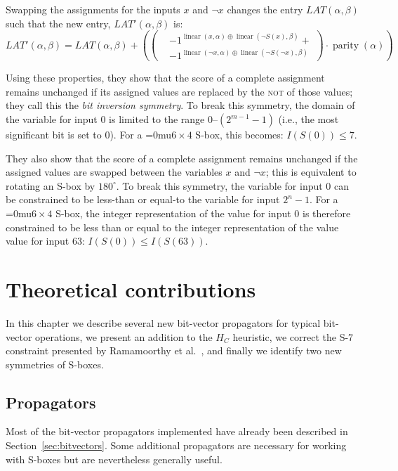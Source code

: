 \documentclass[a4paper,10pt,twoside,openright]{book}
\renewcommand{\sc}[1]{\textsc{\lowercase{#1}}}
\newcommand*\sixbyfour{\begingroup\medmuskip=0mu\relax$6 \times 4$\endgroup}
\DeclareMathOperator{\parity}{parity}
\DeclareMathOperator{\lin}{linear}
\begin{document}
Swapping the assignments for the inputs $x$ and $\lnot x$
changes the entry $\mathit{LAT}(\alpha,\beta)$
such that the new entry, $\mathit{LAT}'(\alpha,\beta)$ is:
\[
\mathit{LAT}'(\alpha,\beta) = \mathit{LAT}(\alpha,\beta) + \left(
    \left(
        \begin{aligned}
        &-1^{\lin(x,\alpha) \oplus \lin(\lnot S(x), \beta)} + \\
        &-1^{\lin(\lnot x,\alpha) \oplus \lin(\lnot S(\lnot x), \beta)} 
        \end{aligned}
    \right)
    \cdot 
    \parity(\alpha) 
\right)
\]

Using these properties, 
they show that the score of a complete assignment remains unchanged if 
its assigned values are replaced by the \sc{NOT} of those values;
they call this the \textit{bit inversion symmetry}.
To break this symmetry, the domain of the variable for input $0$ is limited to the range $0$--$(2^{m-1}-1)$ (i.e., the most significant bit is set to $0$).
For a \sixbyfour{} S-box, this becomes: $I(S(0)) \leq 7$.

They also show that the score of a complete assignment remains unchanged if 
the assigned values are swapped between the variables $x$ and $\lnot x$;
this is equivalent to rotating an S-box by $180^{\circ}$\negthinspace.
To break this symmetry, the variable for input $0$ 
can be constrained to be less-than or equal-to the variable for input $2^n-1$.
For a \sixbyfour{} S-box, the 
integer representation of the
value for input $0$ is therefore constrained
to be less than or equal to the 
integer representation of the value
value for input $63$: 
$I(S(0)) \leq I(S(63))$.

\chapter{Theoretical contributions}
\label{sec:contributions}
In this chapter we describe several new bit-vector propagators for typical
bit-vector operations,
we present an addition to the $H_C$ heuristic,
we correct the S-7 constraint presented by Ramamoorthy et al.~\cite{sboxsymmetry},
and finally we identify two new symmetries of S-boxes.

\section{Propagators}
\label{sec:propagators}
Most of the bit-vector propagators implemented have already been described in Section~\ref{sec:bitvectors}. Some additional propagators are necessary for working with S-boxes but are nevertheless generally useful.
\end{document}
